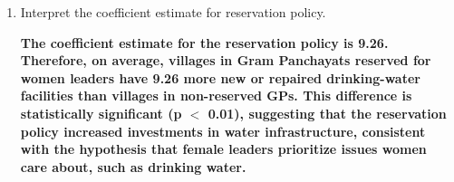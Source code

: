 \documentclass[12pt,letterpaper]{article}
\begin{document}
\begin{enumerate}
		
		
	
	\vspace{6cm}
	\item [(c)] Interpret the coefficient estimate for reservation policy. 
	
	\textbf{The coefficient estimate for the reservation policy is 9.26. Therefore, on average, villages in Gram Panchayats reserved for women leaders have 9.26 more new or repaired drinking-water facilities than villages in non-reserved GPs.
	This difference is statistically significant (p $<$ 0.01), suggesting that the reservation policy increased investments in water infrastructure, consistent with the hypothesis that female leaders prioritize issues women care about, such as drinking water.}
\end{enumerate}

%
%
\end{document}
